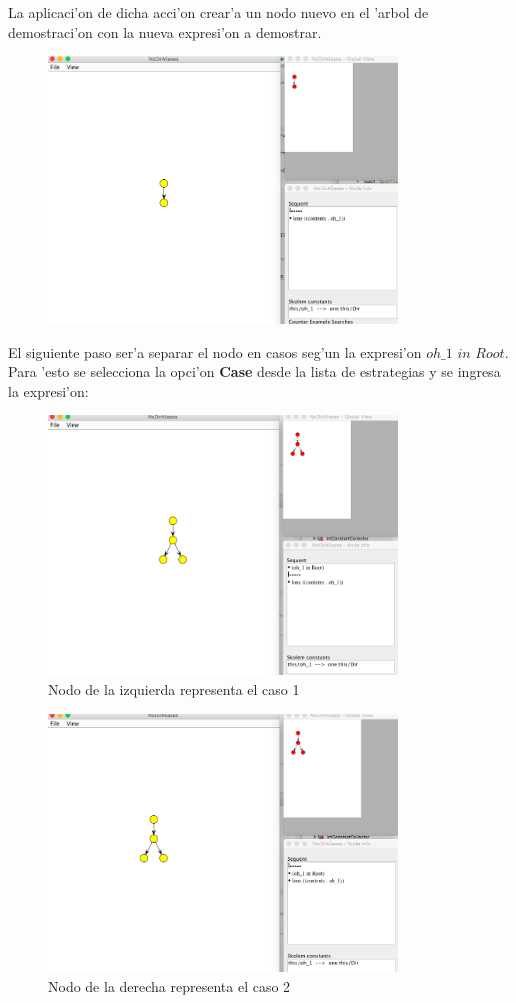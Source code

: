 La aplicaci'on de dicha acci'on crear'a un nodo nuevo en el 'arbol de demostraci'on con la nueva expresi'on a demostrar.

\begin{figure}[H]
	\includegraphics[width=350px]{img/ejemplo/5.png}
	\centering
	\caption{}
\end{figure}

El siguiente paso ser'a separar el nodo en casos seg'un la expresi'on $oh\_1$ $in$ $Root$. Para 'esto se selecciona la opci'on \textbf{Case} desde la lista de estrategias y se ingresa la expresi'on:

\begin{figure}[H]
	\includegraphics[width=350px]{img/ejemplo/7.png}
	\centering
	\caption{Nodo de la izquierda representa el caso 1}
\end{figure}

\begin{figure}[H]
	\includegraphics[width=350px]{img/ejemplo/8.png}
	\centering
	\caption{Nodo de la derecha representa el caso 2}
\end{figure}

